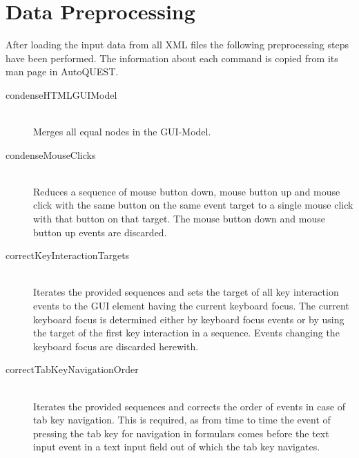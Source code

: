 \section{Data Preprocessing}
After loading the input data from all XML files the following preprocessing steps have been performed. The information about each command is copied from its man page in AutoQUEST.
\begin{description}
	\item[condenseHTMLGUIModel]\hfill\\ Merges all equal nodes in the GUI-Model.
	\item[condenseMouseClicks]\hfill\\ Reduces a sequence of mouse button down, mouse button up and mouse click with the same button on the same event target to a single mouse click with that button on that target. The mouse button down and mouse button up events are discarded.
	\item[correctKeyInteractionTargets]\hfill\\ Iterates the provided sequences and sets the target of all key interaction events to the GUI element having the current keyboard focus. The current keyboard focus is determined either by keyboard focus events or by using the target of the first key interaction in a sequence. Events changing the keyboard focus are discarded herewith.
	\item[correctTabKeyNavigationOrder]\hfill\\ Iterates the provided sequences and corrects the order of events in case of tab key navigation. This is required, as from time to time the event of pressing the tab key for navigation in formulars comes before the text input event in a text input field out of which the tab key navigates.
\end{description}

